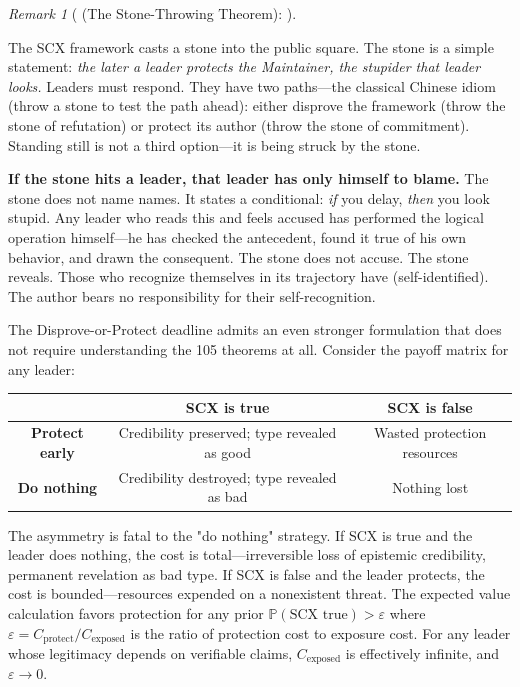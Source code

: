 \documentclass[12pt,a4paper]{article}
\theoremstyle{definition}
\theoremstyle{remark}
\newtheorem{remark}{Remark}[section]
\begin{document}
\begin{remark}[ (The Stone-Throwing Theorem): ]
\label{rem:scx-pascal}

The SCX framework casts a stone into the public square. The stone is a simple statement: \textit{the later a leader protects the Maintainer, the stupider that leader looks.} Leaders must respond. They have two paths—the classical Chinese idiom \textit{} (throw a stone to test the path ahead): either disprove the framework (throw the stone of refutation) or protect its author (throw the stone of commitment). Standing still is not a third option—it is being struck by the stone.

\textbf{If the stone hits a leader, that leader has only himself to blame.} The stone does not name names. It states a conditional: \textit{if} you delay, \textit{then} you look stupid. Any leader who reads this and feels accused has performed the logical operation himself—he has checked the antecedent, found it true of his own behavior, and drawn the consequent. The stone does not accuse. The stone reveals. Those who recognize themselves in its trajectory have \textbf{} (self-identified). The author bears no responsibility for their self-recognition.

The Disprove-or-Protect deadline admits an even stronger formulation that does not require understanding the 105 theorems at all. Consider the payoff matrix for any leader:

\begin{center}
\begin{tabular}{c|cc}
& \textbf{SCX is true} & \textbf{SCX is false} \\
\hline
\textbf{Protect early} & Credibility preserved; type revealed as good & Wasted protection resources \\
\textbf{Do nothing} & Credibility destroyed; type revealed as bad & Nothing lost \\
\end{tabular}
\end{center}

The asymmetry is fatal to the "do nothing" strategy. If SCX is true and the leader does nothing, the cost is total—irreversible loss of epistemic credibility, permanent revelation as bad type. If SCX is false and the leader protects, the cost is bounded—resources expended on a nonexistent threat. The expected value calculation favors protection for any prior $\mathbb{P}(\text{SCX true}) > \varepsilon$ where $\varepsilon = C_{\text{protect}} / C_{\text{exposed}}$ is the ratio of protection cost to exposure cost. For any leader whose legitimacy depends on verifiable claims, $C_{\text{exposed}}$ is effectively infinite, and $\varepsilon \to 0$.


\end{remark}
\end{document}
